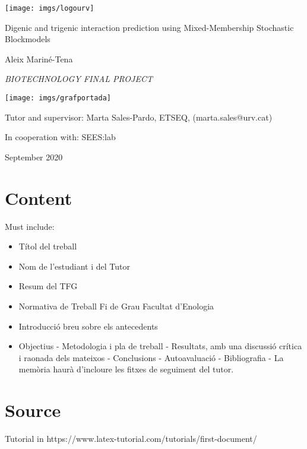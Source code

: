 \documentclass[12pt]{report}
\title{}
\date{11-06-2020}
\author{Aleix Mariné-Tena}
\begin{document}
  \begin{titlepage}
    
    \centering
    \texttt{[image: imgs/logourv]}
    \par        
    \vspace{1cm}
    \Large
    {Digenic and trigenic interaction prediction using Mixed-Membership Stochastic Blockmodels \par}
    \vspace{1cm}
    {Aleix Mariné-Tena \par}
    \vspace{1cm}
    {\itshape\Large BIOTECHNOLOGY FINAL PROJECT \par}
    \vfill

    \vspace{1cm} 
    \texttt{[image: imgs/grafportada]}
    \par    
    \vspace{1cm}  
    \vfill
    
    \large
    \raggedright
    {Tutor and supervisor: Marta Sales-Pardo, ETSEQ, (marta.sales@urv.cat) \par}
    {In cooperation with: SEES:lab \par}
 	\vspace{2cm}
    
    \raggedleft
    {\large September 2020 \par}
  \end{titlepage}
  \maketitle
  \newpage

  
  \tableofcontents
  \newpage

  
\section{Content}
Must include:
\begin{itemize}
	\item Títol del treball
	\item Nom de l’estudiant i del Tutor
	\item Resum del TFG 
	\item Normativa de Treball Fi de Grau Facultat d’Enologia
	\item Introducció breu sobre els antecedents
	\item Objectius
- Metodologia i pla de treball
- Resultats, amb una discussió crítica i raonada dels mateixos
- Conclusions
- Autoavaluació
- Bibliografia
- La memòria haurà d’incloure les fitxes de seguiment del tutor. 
\end{itemize}


\section{Source}
Tutorial in https://www.latex-tutorial.com/tutorials/first-document/
\end{document}
